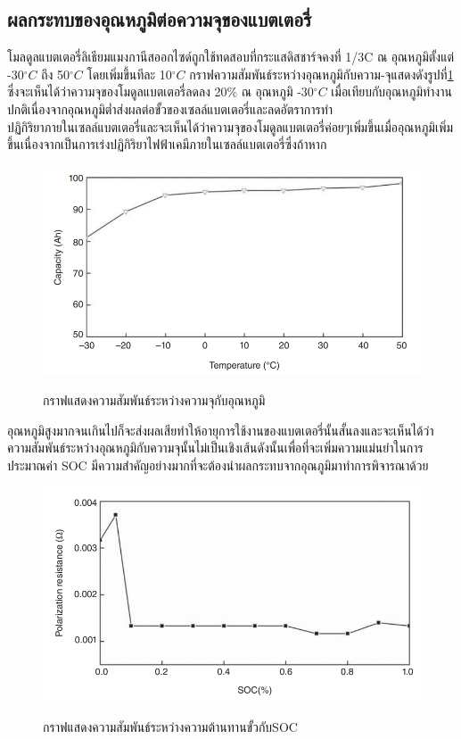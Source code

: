 \subsection{ผลกระทบของอุณหภูมิต่อความจุของแบตเตอรี่}
โมลดูลแบตเตอรี่ลิเธียมแมงกานีสออกไซด์ถูกใช้ทดสอบที่กระแสดิสชาร์จคงที่ 1/3C ณ อุณหภูมิตั้งแต่ -30$^{\circ}C$ ถึง 50$^{\circ}C$ โดยเพิ่มขึ้นทีละ 10$^{\circ}C$  กราฟความสัมพันธ์ระหว่างอุณหภูมิกับความ-จุแสดงดังรูปที่\ref{fig:Ah Vs Temp} ซึ่งจะเห็นได้ว่าความจุของโมดูลแบตเตอรี่ลดลง 20\% ณ อุณหภูมิ -30$^{\circ}C$ เมื่อเทียบกับอุณหภูมิทำงานปกติเนื่องจากอุณหภูมิต่ำส่งผลต่อขั้วของเซลล์แบตเตอรี่และลดอัตราการทำ\\
ปฏิกิริยาภายในเซลล์แบตเตอรี่และจะเห็นได้ว่าความจุของโมดูลแบตเตอรี่ค่อยๆเพิ่มขึ้นเมื่ออุณหภูมิเพิ่มขึ้นเนื่องจากเป็นการเร่งปฏิกิริยาไฟฟ้าเคมีภายในเซลล์แบตเตอรี่ซึ่งถ้าหาก
\begin{center}
	\begin{figure}[H]
		\includegraphics[width=0.6\linewidth]{Chapters/img/Current_vs_Temp.png}
			\centering
			\captionsetup{justification=centering,margin=2cm}
			\caption{กราฟแสดงความสัมพันธ์ระหว่างความจุกับอุณหภูมิ}
			\cite{jiangzhang2015}
			\label{fig:Ah Vs Temp}
	\end{figure}
\end{center}
อุณหภูมิสูงมากจนเกินไปก็จะส่งผลเสียทำให้อายุการใช้งานของแบตเตอรี่นั้นสั้นลงและจะเห็นได้ว่าความสัมพันธ์ระหว่างอุณหภูมิกับความจุนั้นไม่เป็นเชิงเส้นดังนั้นเพื่อที่จะเพิ่มความแม่นยำในการประมาณค่า SOC มีความสำคัญอย่างมากที่จะต้องนำผลกระทบจากอุณภูมิมาทำการพิจารณาด้วย
\begin{center}
	\begin{figure}[H]
		\includegraphics[width=0.6\linewidth]{Chapters/img/Pol_Resistance_vs_SOC.png}
			\centering
			\captionsetup{justification=centering,margin=2cm}
			\caption{กราฟแสดงความสัมพันธ์ระหว่างความต้านทานขั้วกับSOC}
			\cite{jiangzhang2015}
	\end{figure}
\end{center}
